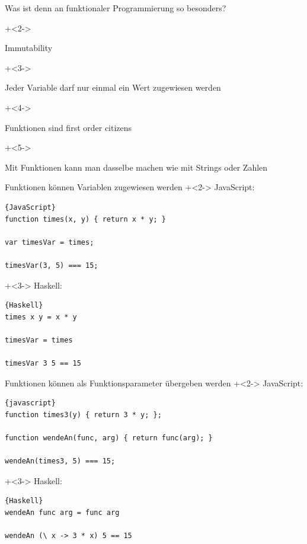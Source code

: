 \begin{frame}[fragile]{Was ist denn an funktionaler Programmierung so besonders?}

\onslide+<2->
\begin{center}
\Large
Immutability
\end{center}

\onslide+<3->
\begin{center}
Jeder Variable darf nur einmal ein Wert zugewiesen werden
\end{center}

\vspace{1em}

\onslide+<4->
\begin{center}
\Large
Funktionen sind \glqq{}first order citizens\grqq{}
\end{center}

\onslide+<5->
\begin{center}
Mit Funktionen kann man dasselbe machen wie mit Strings oder Zahlen
\end{center}

\end{frame}

\begin{frame}[fragile]{Funktionen können Variablen zugewiesen werden}
\onslide+<2->
JavaScript:
\begin{lstlisting}{JavaScript}
function times(x, y) { return x * y; }

var timesVar = times;
    
timesVar(3, 5) === 15;
\end{lstlisting}

\onslide+<3->
Haskell:
\begin{lstlisting}{Haskell}
times x y = x * y

timesVar = times

timesVar 3 5 == 15
\end{lstlisting}

\end{frame}

\begin{frame}[fragile]{Funktionen können als Funktionsparameter übergeben werden}
\onslide+<2->
JavaScript:
\begin{lstlisting}{javascript}
function times3(y) { return 3 * y; };

function wendeAn(func, arg) { return func(arg); }

wendeAn(times3, 5) === 15;
\end{lstlisting}

\onslide+<3->
Haskell:
\begin{lstlisting}{Haskell}
wendeAn func arg = func arg

wendeAn (\ x -> 3 * x) 5 == 15
\end{lstlisting}

\end{frame}

